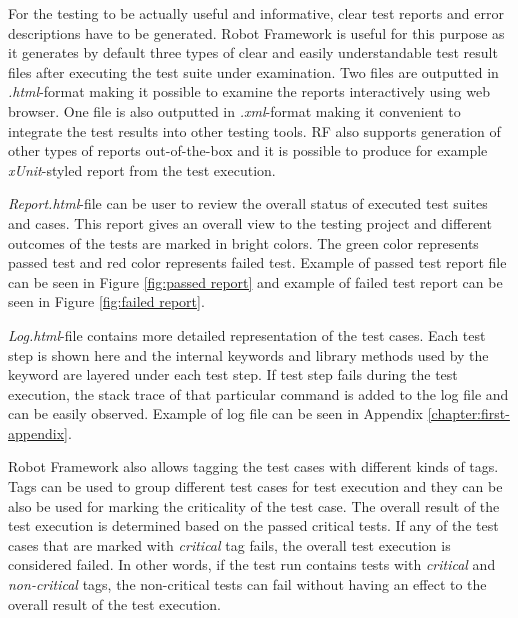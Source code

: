 For the testing to be actually useful and informative, clear test reports and error descriptions have to be generated. Robot Framework is useful for this purpose as it generates by default three types of clear and easily understandable test result files after executing the test suite under examination. Two files are outputted in \emph{.html}-format making it possible to examine the reports interactively using web browser. One file is also outputted in \emph{.xml}-format making it convenient to integrate the test results into other testing tools. RF also supports generation of other types of reports out-of-the-box and it is possible to produce for example \emph{xUnit}-styled report from the test execution. \citep{Rfuserguide}

\emph{Report.html}-file can be user to review the overall status of executed test suites and cases. This report gives an overall view to the testing project and different outcomes of the tests are marked in bright colors. The green color represents passed test and red color represents failed test. Example of passed test report file can be seen in Figure \ref{fig:passed report} and example of failed test report can be seen in Figure \ref{fig:failed report}.

\emph{Log.html}-file contains more detailed representation of the test cases. Each test step is shown here and the internal keywords and library methods used by the keyword are layered under each test step. If test step fails during the test execution, the stack trace of that particular command is added to the log file and can be easily observed. Example of log file can be seen in Appendix \ref{chapter:first-appendix}.

Robot Framework also allows tagging the test cases with different kinds of tags. Tags can be used to group different test cases for test execution and they can be also be used for marking the criticality of the test case. The overall result of the test execution is determined based on the passed critical tests. If any of the test cases that are marked with \emph{critical} tag fails, the overall test execution is considered failed. In other words, if the test run contains tests with \emph{critical} and \emph{non-critical} tags, the non-critical tests can fail without having an effect to the overall result of the test execution. \citep{Rfuserguide}

